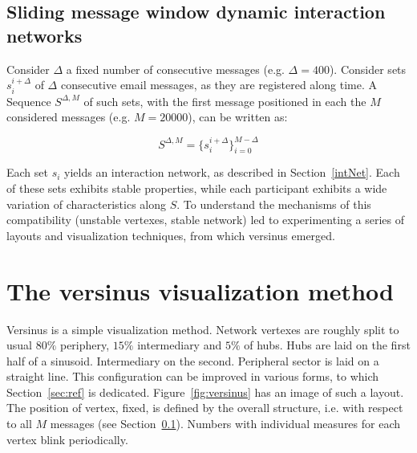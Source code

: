 \documentclass[%
 aip,
 jmp,%
 amsmath,amssymb,
 reprint,%
]{revtex4-1}
\begin{document}
\subsection{Sliding message window dynamic interaction networks}\label{sec:sliding}
Consider $\Delta$ a fixed number of consecutive messages (e.g. $\Delta=400$). Consider sets $s_{i}^{i+\Delta}$ of $\Delta$ consecutive email messages, as they are registered along time. A Sequence $S^{\Delta,M}$ of such sets, with the first message positioned in each the $M$ considered messages (e.g. $M=20000$), can be written as: 

\begin{equation}
S^{\Delta,M}=\{s_i^{i+\Delta}\}_{i=0}^{M-\Delta}
\end{equation}

Each set $s_i$ yields an interaction network, as described in Section~\ref{intNet}. Each of these sets exhibits stable properties, while each participant exhibits a wide variation of characteristics along $S$. To understand the mechanisms of this compatibility (unstable vertexes, stable network) led to experimenting a series of layouts and visualization techniques, from which versinus emerged.

\section{The versinus visualization method}\label{vmethod}
Versinus is a simple visualization method. Network vertexes are roughly split to usual $80\%$ periphery, $15\%$ intermediary and $5\%$ of hubs. Hubs are laid on the first half of a sinusoid. Intermediary on the second. Peripheral sector is laid on a straight line. This configuration can be improved in various forms, to which Section~\ref{sec:ref} is dedicated. Figure~\ref{fig:versinus} has an image of such a layout. The position of vertex, fixed, is defined by the overall structure, i.e. with respect to all $M$ messages (see Section~\ref{sec:sliding}). Numbers with individual measures for each vertex blink periodically.
\end{document}
